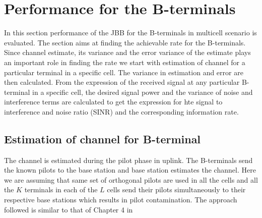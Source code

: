 \documentclass[10pt, a4paper, twoside,fleqn]{article}
\begin{document}
\section{Performance for the B-terminals}
	In this section performance of the JBB for the B-terminals in multicell scenario is evaluated. The section aims at finding the achievable rate for the B-terminals. Since channel estimate, its variance and the error variance of the estimate plays an important role in finding the rate we start with estimation of channel for a particular terminal in a specific cell. The variance in estimation and error are then calculated. From the expression of the received signal at any particular B-terminal in a specific cell, the desired signal power and the variance of noise and interference terms are calculated to get the expression for hte signal to interference and noise ratio (SINR) and the corresponding information rate.

\subsection{Estimation of channel for B-terminal} \label{sec:btchesti}
	The channel is estimated during the pilot phase in uplink. The B-terminals send the known pilots to the base station and base station estimates the channel. Here we are assuming that same set of orthogonal pilots are used in all the cells and all the $K$ terminals in each of the $L$ cells send their pilots simultaneously to their respective base stations which results in pilot contamination. The approach followed is similar to that of Chapter 4 in \cite{bib:MassiveMimoBook}
\end{document}
